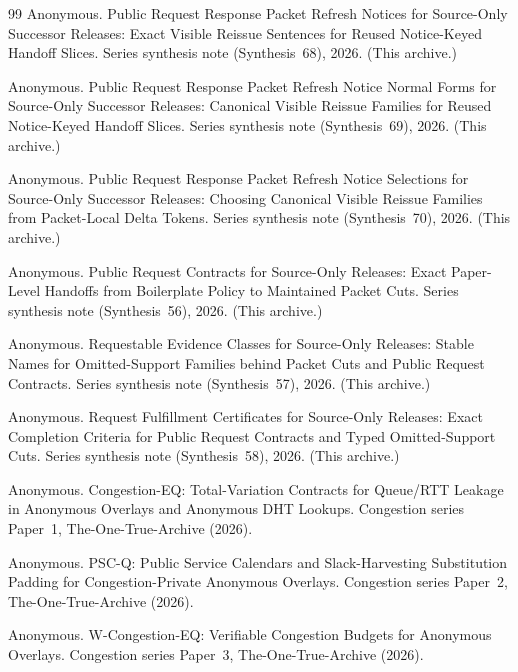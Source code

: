 \documentclass[11pt]{article}
\begin{document}
\begin{thebibliography}{99}
Anonymous.
\newblock Public Request Response Packet Refresh Notices for Source-Only Successor Releases: Exact Visible Reissue Sentences for Reused Notice-Keyed Handoff Slices.
\newblock Series synthesis note (Synthesis~68), 2026. (This archive.)

Anonymous.
\newblock Public Request Response Packet Refresh Notice Normal Forms for Source-Only Successor Releases: Canonical Visible Reissue Families for Reused Notice-Keyed Handoff Slices.
\newblock Series synthesis note (Synthesis~69), 2026. (This archive.)

Anonymous.
\newblock Public Request Response Packet Refresh Notice Selections for Source-Only Successor Releases: Choosing Canonical Visible Reissue Families from Packet-Local Delta Tokens.
\newblock Series synthesis note (Synthesis~70), 2026. (This archive.)

Anonymous.
\newblock Public Request Contracts for Source-Only Releases: Exact Paper-Level Handoffs from Boilerplate Policy to Maintained Packet Cuts.
\newblock Series synthesis note (Synthesis~56), 2026. (This archive.)

Anonymous.
\newblock Requestable Evidence Classes for Source-Only Releases: Stable Names for Omitted-Support Families behind Packet Cuts and Public Request Contracts.
\newblock Series synthesis note (Synthesis~57), 2026. (This archive.)

Anonymous.
\newblock Request Fulfillment Certificates for Source-Only Releases: Exact Completion Criteria for Public Request Contracts and Typed Omitted-Support Cuts.
\newblock Series synthesis note (Synthesis~58), 2026. (This archive.)


Anonymous.
\newblock Congestion-EQ: Total-Variation Contracts for Queue/RTT Leakage in Anonymous Overlays and Anonymous DHT Lookups.
\newblock Congestion series Paper~1, The-One-True-Archive (2026).

Anonymous.
\newblock PSC-Q: Public Service Calendars and Slack-Harvesting Substitution Padding for Congestion-Private Anonymous Overlays.
\newblock Congestion series Paper~2, The-One-True-Archive (2026).

Anonymous.
\newblock W-Congestion-EQ: Verifiable Congestion Budgets for Anonymous Overlays.
\newblock Congestion series Paper~3, The-One-True-Archive (2026).


\end{thebibliography}
\end{document}
